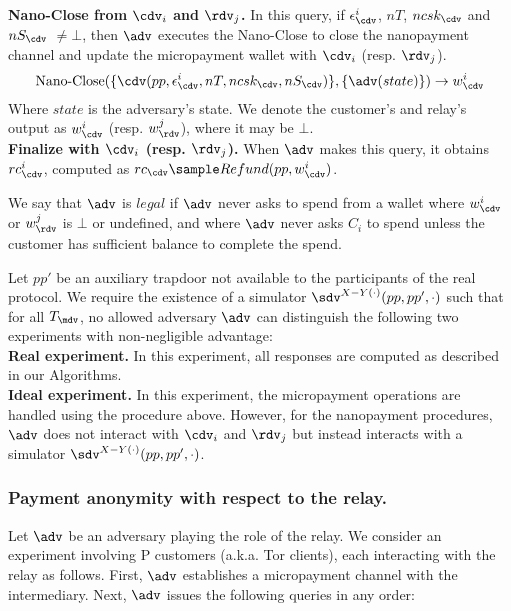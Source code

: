 \textbf{Nano-Close from $\cdv_i$ and $\rdv_j$.}
In this query, if $\epsilon^i_\cdv$, $nT$, $ncsk_\cdv$ and $nS_\cdv$ $\neq \bot$, then $\adv$ executes the Nano-Close to close the nanopayment channel and update the micropayment wallet with $\cdv_i$ (resp.
$\rdv_j$).
$$\operatorname{Nano-Close}(\{\cdv(pp, \epsilon^i_\cdv, nT, ncsk_\cdv, nS_\cdv)\}, \{\adv(state)\}) \rightarrow w^i_\cdv$$ Where $state$ is the adversary's state.
We denote the customer's and relay's output as $w^i_\cdv$ (resp.
$w^j_\rdv$), where it may be $\bot$.\\

\textbf{Finalize with $\cdv_i$ (resp.
  $\rdv_j$).}
When $\adv$ makes this query, it obtains $rc^i_\cdv$, computed as $rc_\cdv \sample Refund(pp, w^i_\cdv)$.

We say that $\adv$ is $legal$ if $\adv$ never asks to spend from a wallet where $w^i_\cdv$ or $w^j_\rdv$ is $\bot$ or undefined, and where $\adv$ never asks $C_i$ to spend unless the customer has sufficient balance to complete the spend.

Let $pp'$ be an auxiliary trapdoor not available to the participants of the real protocol.
We require the existence of a simulator $\sdv^{X-Y(\cdot)}(pp, pp',
\cdot)$ such that for all $T_\mdv$, no allowed adversary $\adv$ can
distinguish the following two experiments with non-negligible
advantage:\\

\textbf{Real experiment.}
In this experiment, all responses are computed as described in our Algorithms.\\

\textbf{Ideal experiment.}
In this experiment, the micropayment operations are handled using the procedure above.
However, for the nanopayment procedures, $\adv$ does not interact with $\cdv_i$ and $\rdv_j$ but instead interacts with a simulator $\sdv^{X-Y(\cdot)}(pp,pp',\cdot)$.

\subsubsection{Payment anonymity with respect to the relay.}
\label{def:anon2}

Let $\adv$ be an adversary playing the role of the relay.
We consider an experiment involving P customers (a.k.a.
Tor clients), each interacting with the relay as follows.
First, $\adv$ establishes a micropayment channel with the intermediary.
Next, $\adv$ issues the following queries in any order:\\

